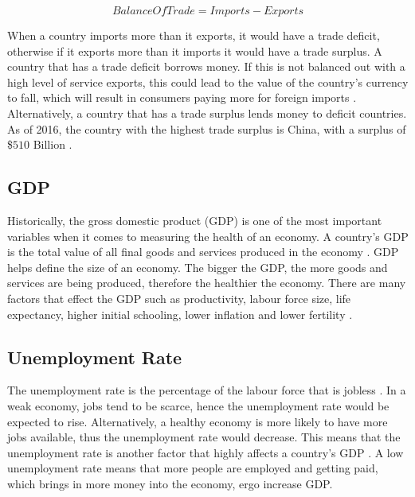 \documentclass{UoYCSproject}
\begin{document}
\begin{equation}
    Balance Of Trade = Imports - Exports
\end{equation}

When a country imports more than it exports, it would have a trade deficit, otherwise if it exports more than it imports it would have a trade surplus. A country that has a trade deficit borrows money. If this is not balanced out with a high level of service exports, this could lead to the value of the country's currency to fall, which will result in consumers paying more for foreign imports \cite{2003economics}. Alternatively, a country that has a trade surplus lends money to deficit countries. As of 2016, the country with the highest trade surplus is China, with a surplus of \$$510$ Billion \cite{tradesurplus}.   

\subsection{GDP}
Historically, the gross domestic product (GDP) is one of the most important variables when it comes to measuring the health of an economy. A country's GDP is the total value of all final goods and services produced in the economy \cite{2003economics}. GDP helps define the size of an economy. The bigger the GDP, the more goods and services are being produced, therefore the healthier the economy.  There are many factors that effect the GDP such as productivity, labour force size, life expectancy, higher initial schooling, lower inflation and lower fertility \cite{barro1996determinants}. 

\subsection{Unemployment Rate}
The unemployment rate is the percentage of the labour force that is jobless \cite{unemployment}. In a weak economy, jobs tend to be scarce, hence the unemployment rate would be expected to rise. Alternatively, a healthy economy is more likely to have more jobs available, thus the unemployment rate would decrease. This means that the unemployment rate is another factor that highly affects a country's GDP \cite{bean1993unemployment}. A low unemployment rate means that more people are employed and getting paid, which brings in more money into the economy, ergo increase GDP.  
\end{document}
